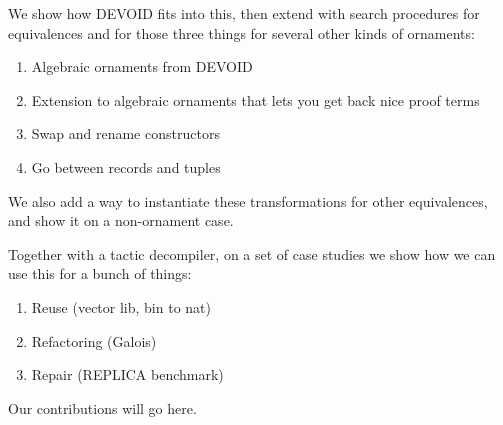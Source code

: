 We show how DEVOID fits into this, then extend with search procedures for equivalences and for those three things
for several other kinds of ornaments:

\begin{enumerate}
  \item Algebraic ornaments from DEVOID
  \item Extension to algebraic ornaments that lets you get back nice proof terms
  \item Swap and rename constructors
  \item Go between records and tuples
\end{enumerate}
We also add a way to instantiate these transformations for other equivalences,
and show it on a non-ornament case.
 
Together with a tactic decompiler, on a set of case studies we show how we can use this for a bunch of things:

\begin{enumerate}
  \item Reuse (vector lib, bin to nat)
  \item Refactoring (Galois)
  \item Repair (REPLICA benchmark)
\end{enumerate}

Our contributions will go here.
